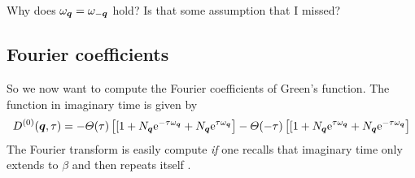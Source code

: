 \documentclass[11pt, english, fleqn, DIV=15, headinclude, BCOR=1cm]{scrartcl}
\begin{document}
\begin{question}
    Why does $\omegaq = \omegamq$ hold? Is that some assumption that I missed?
\end{question}

\subsection{Fourier coefficients}

So we now want to compute the Fourier coefficients of Green's function. The
function in imaginary time is given by
\[
    D^{(0)}(\vec q, \tau)
    =
    - \Theta(\tau) \sbr{
        [1 + N_{\vec q} \eup^{-\tau \omegaq} + N_{\vec q} \eup^{\tau \omegaq}
    }
    - \Theta(-\tau) \sbr{
        [1 + N_{\vec q} \eup^{\tau \omegaq} + N_{\vec q} \eup^{-\tau \omegaq}
    }
\]
The Fourier transform is easily compute \emph{if} one recalls that imaginary
time only extends to $\beta$ and then repeats itself \Winkey.
\end{document}
